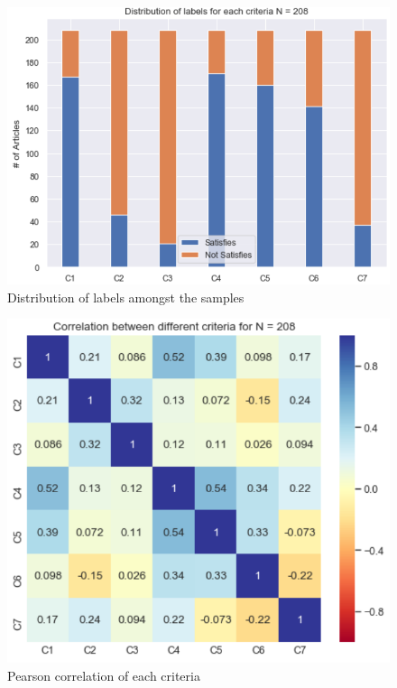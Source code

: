 \documentclass[a4paper,twoside,phd]{BYUPhys}
\begin{document}
\begin{figure}[!htb]
	\centering
	\includegraphics[totalheight=8cm]{images/label-distribution-208.png}
	\caption{Distribution of labels amongst the samples}
	\label{fig:LabelDistribution}
\end{figure}

\begin{figure}[!htb]
	\centering
	\includegraphics[totalheight=8cm]{images/criteria-correlation-208.png}
	\caption{Pearson correlation of each criteria}
	\label{fig:CriteriaCorrelation}
\end{figure}
\end{document}
